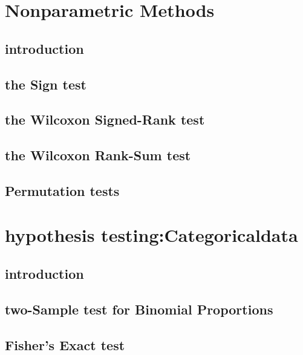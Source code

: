 \documentclass[12pt,]{article}
\theoremstyle{definition}
\theoremstyle{definition}
\theoremstyle{definition}
\theoremstyle{remark}
\begin{document}
\section{Nonparametric Methods}\label{nonparametric-methods}

\subsection{introduction}\label{introduction-6}

\subsection{the Sign test}\label{the-sign-test}

\subsection{the Wilcoxon Signed-Rank
test}\label{the-wilcoxon-signed-rank-test}

\subsection{the Wilcoxon Rank-Sum
test}\label{the-wilcoxon-rank-sum-test}

\subsection{Permutation tests}\label{permutation-tests}

\section{hypothesis
testing:Categoricaldata}\label{hypothesis-testingcategoricaldata}

\subsection{introduction}\label{introduction-7}

\subsection{two-Sample test for Binomial
Proportions}\label{two-sample-test-for-binomial-proportions}

\subsection{Fisher's Exact test}\label{fishers-exact-test}
\end{document}
